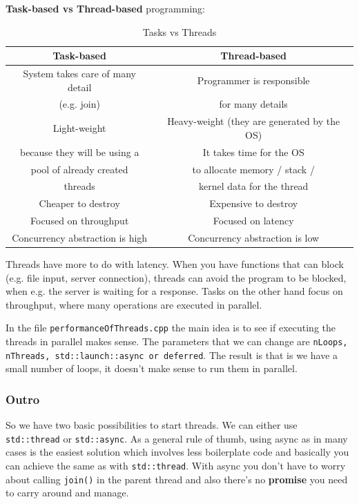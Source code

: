 \documentclass[11pt, a4paper]{article}
\begin{document}
\textbf{Task-based vs Thread-based} programming:

\begin{table}[htpb!]
	\centering
	\caption{Tasks vs Threads}
	\label{tab:tasks_vs_threads}
	\begin{tabular}{|c|c|}
		\hline
	  \textbf{Task-based} & \textbf{Thread-based} \\
		\hline
		\hline
	  System takes care of many detail  & Programmer is responsible \\
		(e.g. join) &  for many details \\
		\hline
		Light-weight  & Heavy-weight (they are generated by the OS) \\
		because they will be using a & It takes time for the OS \\
		pool of already created & to allocate memory / stack /  \\
		threads  & kernel data for the thread \\
		\hline
		Cheaper to destroy    & Expensive to destroy \\
		\hline
		Focused on throughput & Focused on latency \\
	  \hline
		Concurrency abstraction is high & Concurrency abstraction is low \\
		\hline

	\end{tabular}
\end{table}



Threads have more to do with latency. When you have functions that can block (e.g. file input, server connection), threads can avoid the program to be blocked, when e.g. the server is waiting for a response. Tasks on the other hand focus on throughput, where many operations are executed in parallel.


In the file \texttt{performanceOfThreads.cpp} the main idea is to see if executing the threads in parallel makes sense. The parameters that we can change are \texttt{nLoops, nThreads, std::launch::async or deferred}. The result is that is we have a small number of loops, it doesn't make sense to run them in parallel. 



\subsubsection{Outro}%
\label{ssub:outro}

So we have two basic possibilities to start threads. We can either use \texttt{std::thread}  or \texttt{std::async}. As a general rule of thumb, using async as in many cases is the easiest solution which involves less boilerplate code and basically you can achieve the same as with \texttt{std::thread}. With async you don't have to worry about calling \texttt{join()}  in the parent thread and also there's no \textbf{promise} you need to carry around and manage. 
\end{document}
